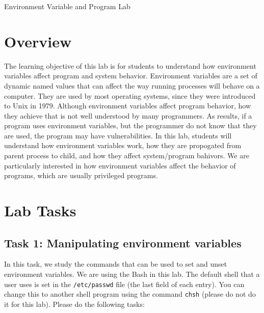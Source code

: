 








\begin{center}
{\LARGE Environment Variable and \setuid Program Lab}
\end{center}

\copyrightnotice


\section{Overview}

The learning objective of this lab is for students to understand how
environment variables affect program and system behavior. Environment
variables are a set of dynamic named values that can affect the way running processes
will behave on a computer. They are used by most operating systems, since
they were introduced to Unix in 1979. Although environment variables affect
program behavior, how they achieve that is not well understood by many
programmers. As results, if a program uses  environment
variables,  but the programmer do not know that they are used, the program
may have vulnerabilities. In this lab, students will understand how
environment variables work, how they are propogated from parent process to
child, and how they affect system/program bahivors. We are particularly
interested in how environment variables affect the behavior of \setuid
programs, which are usually privileged programs. 



\section{Lab Tasks}

\subsection{Task 1: Manipulating environment variables}

In this task, we study the commands that can be used to set and unset
environment variables. We are using the Bash in this lab. The default
shell that a user uses is set in  the {\tt /etc/passwd} file (the last
field of each entry). You can change this to another shell program using
the command {\tt chsh} (please do not do it for this lab). Please 
do the following tasks:


